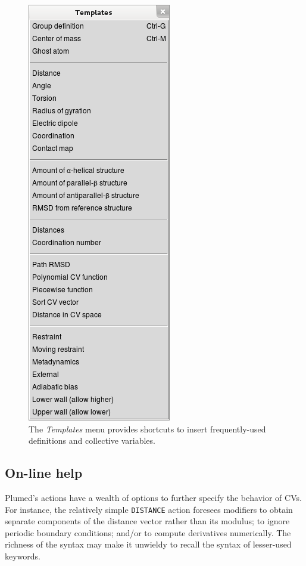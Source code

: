 \documentclass[preprint,12pt]{elsarticle}
\begin{document}
\begin{figure}
  \centering
  \includegraphics[scale=.5]{images/templates}
  \caption{The \emph{Templates} menu provides shortcuts to
    insert frequently-used definitions and collective variables.}
  \label{fig:templates}
\end{figure}

\subsection{On-line help}

Plumed's actions have a wealth of options to further specify the
behavior of CVs. For instance, the relatively simple \texttt{DISTANCE}
action foresees modifiers to obtain separate components of the
distance vector rather than its modulus; to ignore periodic boundary
conditions; and/or to compute derivatives numerically. The richness of
the syntax may make it unwieldy to recall the syntax of lesser-used
keywords.
\end{document}
